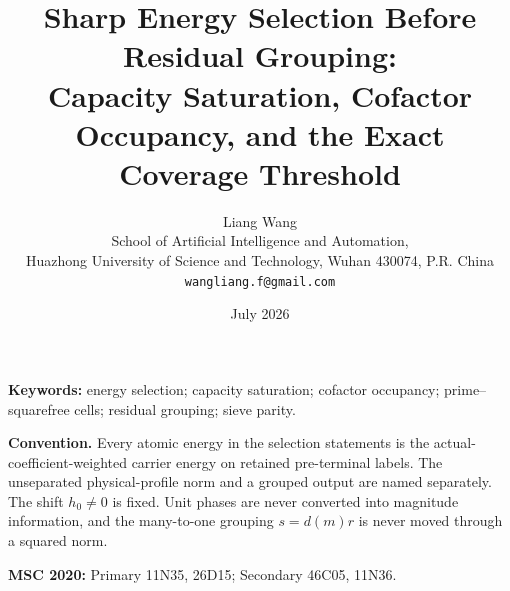 \documentclass[11pt]{article}
\title{\bfseries Sharp Energy Selection Before Residual Grouping:\\
Capacity Saturation, Cofactor Occupancy, and the Exact Coverage Threshold}
\author{Liang Wang\\
\small School of Artificial Intelligence and Automation,\\[-2pt]
\small Huazhong University of Science and Technology, Wuhan 430074, P.R. China\\
\small \texttt{wangliang.f@gmail.com}}
\date{July 2026}
\theoremstyle{definition}
\theoremstyle{remark}
\begin{document}
\maketitle



\noindent\textbf{Keywords:} energy selection; capacity saturation;
cofactor occupancy; prime--squarefree cells; residual grouping; sieve parity.

\newpage
\medskip
\noindent\textbf{Convention.}
Every atomic energy in the selection statements is the
actual-coefficient-weighted carrier energy on retained pre-terminal
labels.  The unseparated physical-profile norm and a grouped output are
named separately.  The shift \(h_0\ne0\) is fixed.  Unit phases are never
converted into magnitude information, and the many-to-one grouping
\(s=d(m)r\) is never moved through a squared norm.

\medskip
\noindent\textbf{MSC 2020:} Primary 11N35, 26D15; Secondary 46C05,
11N36.









\begingroup
\small
\raggedright
\setlength{\bibsep}{4pt plus 1pt minus 1pt}


\endgroup
\end{document}
